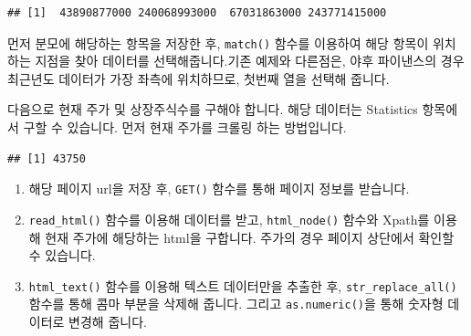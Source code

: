 \documentclass[]{book}
\newenvironment{Shaded}{\begin{snugshade}}{\end{snugshade}}
\newcommand{\DataTypeTok}[1]{\textcolor[rgb]{0.13,0.29,0.53}{#1}}
\newcommand{\KeywordTok}[1]{\textcolor[rgb]{0.13,0.29,0.53}{\textbf{#1}}}
\newcommand{\NormalTok}[1]{#1}
\newcommand{\OperatorTok}[1]{\textcolor[rgb]{0.81,0.36,0.00}{\textbf{#1}}}
\newcommand{\StringTok}[1]{\textcolor[rgb]{0.31,0.60,0.02}{#1}}
\providecommand{\tightlist}{%
  \setlength{\itemsep}{0pt}\setlength{\parskip}{0pt}}
\begin{document}
\begin{verbatim}
## [1]  43890877000 240068993000  67031863000 243771415000
\end{verbatim}

먼저 분모에 해당하는 항목을 저장한 후, \texttt{match()} 함수를 이용하여 해당 항목이 위치하는 지점을 찾아 데이터를 선택해줍니다.기존 예제와 다른점은, 야후 파이낸스의 경우 최근년도 데이터가 가장 좌측에 위치하므로, 첫번째 열을 선택해 줍니다.

다음으로 현재 주가 및 상장주식수를 구해야 합니다. 해당 데이터는 Statistics 항목에서 구할 수 있습니다. 먼저 현재 주가를 크롤링 하는 방법입니다.

\begin{Shaded}
\end{Shaded}

\begin{verbatim}
## [1] 43750
\end{verbatim}

\begin{enumerate}
\def\labelenumi{\arabic{enumi}.}
\tightlist
\item
  해당 페이지 url을 저장 후, \texttt{GET()} 함수를 통해 페이지 정보를 받습니다.
\item
  \texttt{read\_html()} 함수를 이용해 데이터를 받고, \texttt{html\_node()} 함수와 Xpath를 이용해 현재 주가에 해당하는 html을 구합니다. 주가의 경우 페이지 상단에서 확인할 수 있습니다.
\item
  \texttt{html\_text()} 함수를 이용해 텍스트 데이터만을 추출한 후, \texttt{str\_replace\_all()} 함수를 통해 콤마 부분을 삭제해 줍니다. 그리고 \texttt{as.numeric()}을 통해 숫자형 데이터로 변경해 줍니다.
\end{enumerate}
\end{document}
